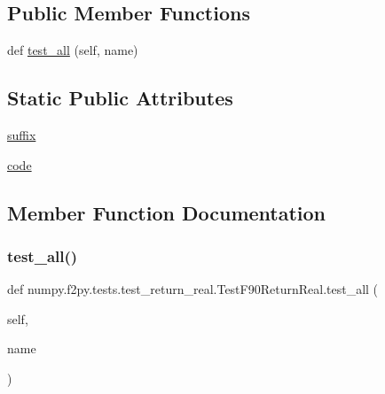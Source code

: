 \subsection*{Public Member Functions}
\begin{DoxyCompactItemize}
\item 
def \hyperlink{classnumpy_1_1f2py_1_1tests_1_1test__return__real_1_1TestF90ReturnReal_af502a0c80fd3884dd6c51dc560232d55}{test\+\_\+all} (self, name)
\end{DoxyCompactItemize}
\subsection*{Static Public Attributes}
\begin{DoxyCompactItemize}
\item 
\hyperlink{classnumpy_1_1f2py_1_1tests_1_1test__return__real_1_1TestF90ReturnReal_a7312e3ff0ca55215f958db87d3e31ea0}{suffix}
\item 
\hyperlink{classnumpy_1_1f2py_1_1tests_1_1test__return__real_1_1TestF90ReturnReal_a18c613bc2ac546c2621ae7d8cbeff520}{code}
\end{DoxyCompactItemize}


\subsection{Member Function Documentation}
\mbox{\label{classnumpy_1_1f2py_1_1tests_1_1test__return__real_1_1TestF90ReturnReal_af502a0c80fd3884dd6c51dc560232d55}} 
\subsubsection{\texorpdfstring{test\+\_\+all()}{test\_all()}}
{\footnotesize\ttfamily def numpy.\+f2py.\+tests.\+test\+\_\+return\+\_\+real.\+Test\+F90\+Return\+Real.\+test\+\_\+all (\begin{DoxyParamCaption}\item[{}]{self,  }\item[{}]{name }\end{DoxyParamCaption})}



